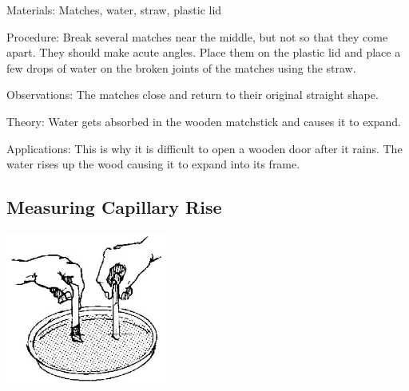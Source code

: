 \begin{multicols}{2}
\begin{description*}
\item[Materials:]{Matches, water, straw, plastic lid}
\item[Procedure:]{Break several matches near the middle, but not so that they come apart. They should make acute angles. Place them on the plastic lid and place a few drops of water on the broken joints of the matches using the straw.}
\item[Observations:]{The matches close and return to their original straight shape.}
\item[Theory:]{Water gets absorbed in the wooden matchstick and causes it to expand.}
\item[Applications:]{This is why it is difficult to open a wooden door after it rains. The water rises up the wood causing it to expand into its frame.}
\end{description*}

\columnbreak

\subsection{Measuring Capillary Rise}

\begin{center}
\includegraphics[width=0.4\textwidth]{./img/source/capillary-rise-meas.jpg}
\end{center}


\end{multicols}
